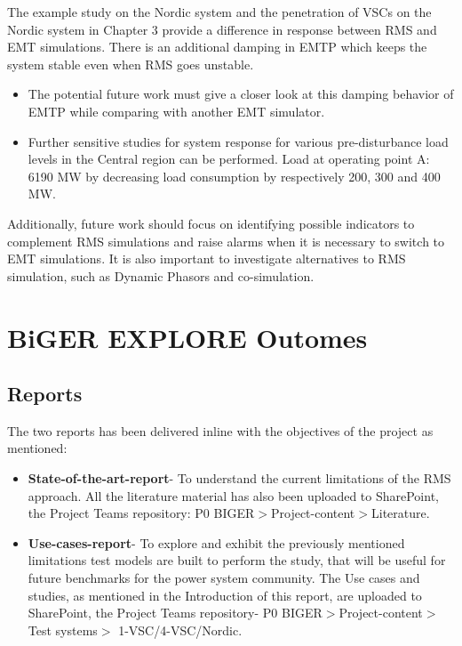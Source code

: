 \documentclass{report}
\begin{document}
The example study on the Nordic system and the penetration of VSCs on the Nordic system in Chapter 3 provide a difference in response between RMS and EMT simulations. There is an additional damping in EMTP which keeps the system stable even when RMS goes unstable.  
\begin{itemize}
    \item The potential future work must give a closer look at this damping behavior of EMTP while comparing with another EMT simulator.
    \item Further sensitive studies for system response for various pre-disturbance load levels in the Central region can be performed. Load at operating point A: 6190 MW by decreasing load consumption by respectively 200, 300 and 400 MW. 
\end{itemize}
 



Additionally, future work should focus on identifying possible indicators to complement RMS simulations and raise alarms when it is necessary to switch to EMT simulations. It is also important to investigate alternatives to RMS simulation, such as Dynamic Phasors and co-simulation.
\section{BiGER EXPLORE Outomes }

\subsection{Reports} 
The two reports has been delivered inline with the objectives of the project as mentioned:\\
\begin{itemize}
    \item \textbf{State-of-the-art-report}- To understand the current limitations of the RMS approach. All the literature material has also been uploaded to SharePoint, the Project Teams repository: P0 BIGER$>$Project-content$>$Literature.
    \item \textbf{Use-cases-report}- To explore and exhibit the previously mentioned limitations test models are built to perform the study, that will be useful for future benchmarks for the power system community.
    The Use cases and studies, as mentioned in the Introduction of this report, are uploaded to SharePoint, the Project Teams repository- P0 BIGER$>$Project-content$>$Test systems$>$ 1-VSC/4-VSC/Nordic.
\end{itemize}
\end{document}
